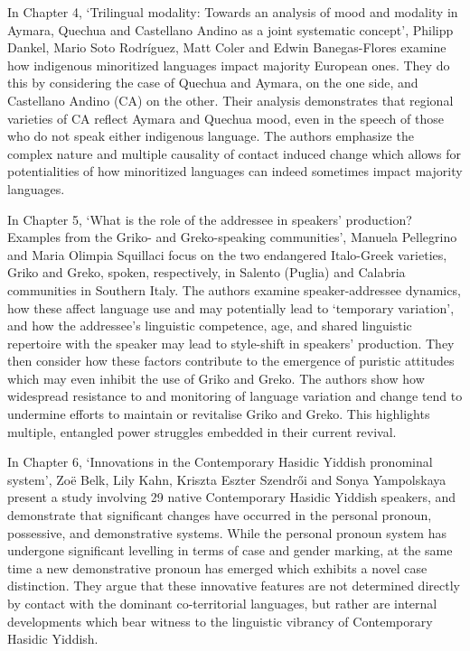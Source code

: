 \documentclass[output=paper]{langscibook}
\begin{document}
In Chapter 4, ‘Trilingual modality: Towards an analysis of mood and modality in Aymara, Quechua and Castellano Andino as a joint systematic concept’, Philipp Dankel, Mario Soto Rodríguez, Matt Coler and Edwin Banegas-Flores examine how indigenous minoritized languages impact majority European ones. They do this by considering the case of Quechua and Aymara, on the one side, and Castellano Andino (CA) on the other. Their analysis demonstrates that regional varieties of CA reflect Aymara and Quechua mood, even in the speech of those who do not speak either indigenous language. The authors emphasize the complex nature and multiple causality of contact induced change which allows for potentialities of how minoritized languages can indeed sometimes impact majority languages.

In Chapter 5, ‘What is the role of the addressee in speakers’ production? Examples from the Griko- and Greko-speaking communities’, Manuela Pellegrino and Maria Olimpia Squillaci focus on the two endangered Italo-Greek varieties, Griko and Greko, spoken, respectively, in Salento (Puglia) and Calabria communities in Southern Italy. The authors examine speaker-addressee dynamics, how these affect language use and may potentially lead to `temporary variation', and how the addressee’s linguistic competence, age, and shared linguistic repertoire with the speaker may lead to style-shift in speakers’ production. They then consider how these factors contribute to the emergence of puristic attitudes which may even inhibit the use of Griko and Greko. The authors show how widespread resistance to and monitoring of language variation and change tend to undermine efforts to maintain or revitalise Griko and Greko. This highlights multiple, entangled power struggles embedded in their current revival.

In Chapter 6, ‘Innovations in the Contemporary Hasidic Yiddish pronominal system’, Zo\"{e} Belk, Lily Kahn, Kriszta Eszter Szendrői and Sonya Yampolskaya present a study involving 29 native Contemporary Hasidic Yiddish speakers, and demonstrate that significant changes have occurred in the personal pronoun, possessive, and demonstrative systems. While the personal pronoun system has undergone significant levelling in terms of case and gender marking, at the same time a new demonstrative pronoun has emerged which exhibits a novel case distinction. They argue that these innovative features are not determined directly by contact with the dominant co-territorial languages, but rather are internal developments which bear witness to the linguistic vibrancy of Contemporary Hasidic Yiddish.
\end{document}
